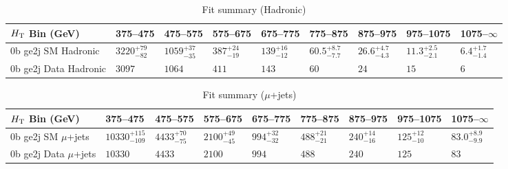 \documentclass[8pt]{article}
\def\scalht{\mbox{$H_{\rm{T}}$}\xspace}
\newcommand\T{\rule{0pt}{2.6ex}}
\begin{document}
\begin{table}[ht!]
\caption{Fit summary (Hadronic)}
\label{tab:ensemble-summary}
\centering
\begin{tabular}{ lllllllll }

\hline
\scalht Bin (GeV)       & 375--475                       & 475--575                       & 575--675                       & 675--775                       & 775--875                       & 875--975                       & 975--1075                      & 1075--$\infty$                 \\ [1.000000ex]
\hline
0b ge2j SM Hadronic\T   & $3220^{+79}_{-82}$             & $1059^{+37}_{-35}$             & $387^{+24}_{-19}$              & $139^{+16}_{-12}$              & $60.5^{+8.7}_{-7.7}$           & $26.6^{+4.7}_{-4.3}$           & $11.3^{+2.5}_{-2.1}$           & $6.4^{+1.7}_{-1.4}$            \\ 
0b ge2j Data Hadronic\T & $3097$                         & $1064$                         & $411$                          & $143$                          & $60$                           & $24$                           & $15$                           & $6$                            \\ 
\hline

\end{tabular}
\end{table}
\begin{table}[ht!]
\caption{Fit summary ($\mu$+jets)}
\label{tab:ensemble-summary}
\centering
\begin{tabular}{ lllllllll }

\hline
\scalht Bin (GeV)       & 375--475                       & 475--575                       & 575--675                       & 675--775                       & 775--875                       & 875--975                       & 975--1075                      & 1075--$\infty$                 \\ [1.000000ex]
\hline
0b ge2j SM $\mu$+jets\T & $10330^{+115}_{-109}$          & $4433^{+70}_{-75}$             & $2100^{+49}_{-45}$             & $994^{+32}_{-32}$              & $488^{+21}_{-21}$              & $240^{+14}_{-16}$              & $125^{+12}_{-10}$              & $83.0^{+8.9}_{-9.9}$           \\ 
0b ge2j Data $\mu$+jets\T & $10330$                        & $4433$                         & $2100$                         & $994$                          & $488$                          & $240$                          & $125$                          & $83$                           \\ 
\hline

\end{tabular}
\end{table}
\end{document}
